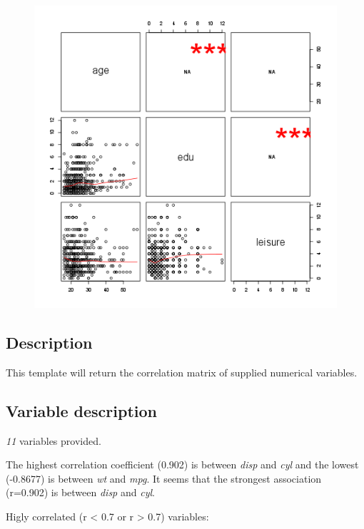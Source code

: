 \documentclass[]{article}
\makeatletter
\def\maxwidth{\ifdim\Gin@nat@width>\linewidth\linewidth
\else\Gin@nat@width\fi}
\let\Oldincludegraphics\includegraphics
\renewcommand{\includegraphics}[1]{\Oldincludegraphics[width=\maxwidth]{#1}}
\makeatother
\begin{document}
\begin{figure}[htbp]
\centering
\includegraphics{fc8b6edbaddadbdf0c5014f99fda88d6.png}
\caption{}
\end{figure}

\subsection{Description}

This template will return the correlation matrix of supplied numerical
variables.

\subsection{Variable description}

\emph{11} variables provided.

The highest correlation coefficient (0.902) is between \emph{disp} and
\emph{cyl} and the lowest (-0.8677) is between \emph{wt} and \emph{mpg}.
It seems that the strongest association (r=0.902) is between \emph{disp}
and \emph{cyl}.

Higly correlated (r \textless{} 0.7 or r \textgreater{} 0.7) variables:
\end{document}
